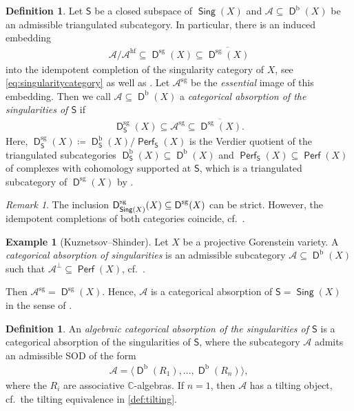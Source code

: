 \documentclass[reqno, 12pt, a4paper, twosided, english]{amsart}
\theoremstyle{plain}
\theoremstyle{definition}
\newtheorem{defn}[thm]{Definition}
\newtheorem{ex}[thm]{Example}
\theoremstyle{remark}
\newtheorem{rem}[thm]{Remark}
\newtheorem*{Key Statement}{Key Statement}
\DeclareMathOperator{\Perf}{\mathsf{Perf}}
\DeclareMathOperator{\Sing}{\mathsf{Sing}}
\newcommand{\opname}[1]{\operatorname{\mathsf{#1}}}
\newcommand{\ca}{{\mathcal A}}
\newcommand{\C}{\mathbb{C}}
\newcommand{\SOD}{SOD\xspace}
\newcommand{\absorption}{algebraic categorical absorption\xspace}
\renewcommand{\subset}{\subseteq}
\newcommand{\sg}{\mathrm{sg}}
\newcommand{\hf}{\mathrm{hf}}
\newcommand{\Dsg}{\opname{D}^{\mathrm{sg}}}
\newcommand{\Db}{\opname{D}^{\mathrm{b}}}
\begin{document}
\begin{defn} \label{D:CatAbs} 
   Let $\mathsf{S}$ be a closed subspace of $\Sing(X)$ and $\ca \subseteq \Db(X)$ be an admissible triangulated subcategory. In particular, there is an induced embedding
   \begin{align*}
    \ca/\ca^{\hf} \subseteq \Dsg(X) \subseteq \overline{\Dsg(X)}
    \end{align*}
    into the idempotent completion of the singularity category of $X$, see \eqref{eq:singularitycategory} as well as .
Let $\ca^{\sg}$ be the \emph{essential} image of this embedding. 
Then we call $\ca \subseteq \Db(X)$ a \emph{categorical absorption of the singularities of $\mathsf{S}$} if
\begin{align*}
   \Dsg_{\mathsf{S}}(X) \subseteq \ca^{\sg} \subseteq \overline{\Dsg(X)}.
\end{align*}
Here, $\Dsg_{\mathsf{S}}(X) \coloneqq \Db_{\mathsf{S}}(X) / \Perf_{\mathsf{S}}(X)$ is the Verdier quotient of the triangulated subcategories $\Db_{\mathsf{S}}(X) \subset \Db(X)$ and $\Perf_{\mathsf{S}}(X) \subset \Perf(X)$ of complexes with cohomology supported at $\mathsf{S}$, which is a triangulated subcategory of $\Dsg(X)$ by \cite[Lemma 2.6]{Orlov11}.
\end{defn}

  \begin{rem}
     The inclusion $\smash{\Dsg_{\Sing(X)}(X)} \subseteq \Dsg(X)$ can be strict. 
    However, the idempotent completions of both categories coincide, cf.\ \cite{Orlov11}. %
  \end{rem}


\begin{ex}[Kuznetsov--Shinder]\label{E:KuzShi}
Let $X$ be a projective Gorenstein variety. A \emph{categorical absorption of singularities} is an admissible subcategory $\ca \subseteq \Db(X)$ such that 
$\ca^\perp \subseteq \Perf(X)$, cf.\ \cite[Definition 1.1]{KS22a}.

Then $\ca^{\sg} = \Dsg(X)$. Hence, $\ca$ is a categorical absorption of $\mathsf{S}=\Sing(X)$ in the sense of . 
\end{ex}

%
%
%
%
%
%



\begin{defn}
An \emph{\absorption of the singularities of $\mathsf{S}$} is a categorical absorption of the singularities of $\mathsf{S}$, where the subcategory $\mathcal{A}$ admits an admissible \SOD of the form
\begin{align*}
\ca = \langle \Db(R_1), \ldots, \Db(R_n) \rangle,
\end{align*}
where the $R_i$ are associative $\C$-algebras. If $n=1$, then $\ca$ has a tilting object, cf.\ the tilting equivalence in \eqref{def:tilting}.
\end{defn}
\end{document}
